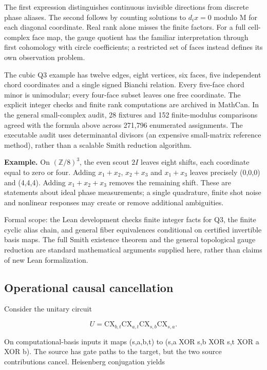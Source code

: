 \documentclass[11pt,a4paper]{article}
\begin{document}
The first expression distinguishes continuous invisible directions from discrete phase aliases. The second follows by counting solutions to $d_i x=0$ modulo M for each diagonal coordinate. Real rank alone misses the finite factors. For a full cell-complex face map, the gauge quotient has the familiar interpretation through first cohomology with circle coefficients; a restricted set of faces instead defines its own observation problem.

The cubic Q3 example has twelve edges, eight vertices, six faces, five independent chord coordinates and a single signed Bianchi relation. Every five-face chord minor is unimodular; every four-face subset leaves one free coordinate. The explicit integer checks and finite rank computations are archived in MathCan. In the general small-complex audit, 28 fixtures and 152 finite-modulus comparisons agreed with the formula above across 271,796 enumerated assignments. The executable audit uses determinantal divisors (an expensive small-matrix reference method), rather than a scalable Smith reduction algorithm.

\textbf{Example.} On $(\mathbb Z/8)^3$, the even scout $2I$ leaves eight shifts, each coordinate equal to zero or four. Adding $x_1+x_2$, $x_2+x_3$ and $x_1+x_3$ leaves precisely (0,0,0) and (4,4,4). Adding $x_1+x_2+x_3$ removes the remaining shift. These are statements about ideal phase measurements; a single quadrature, finite shot noise and nonlinear responses may create or remove additional ambiguities.

Formal scope: the Lean development checks finite integer facts for Q3, the finite cyclic alias chain, and general fiber equivalences conditional on certified invertible basis maps. The full Smith existence theorem and the general topological gauge reduction are standard mathematical arguments supplied here, rather than claims of new Lean formalization.

\subsection{Operational causal cancellation}

Consider the unitary circuit

\[
U=\mathrm{CX}_{b,t}\mathrm{CX}_{a,t}
\mathrm{CX}_{s,b}\mathrm{CX}_{s,a}.
\]

On computational-basis inputs it maps (s,a,b,t) to (s,a XOR s,b XOR s,t XOR a XOR b). The source has gate paths to the target, but the two source contributions cancel. Heisenberg conjugation yields
\end{document}
